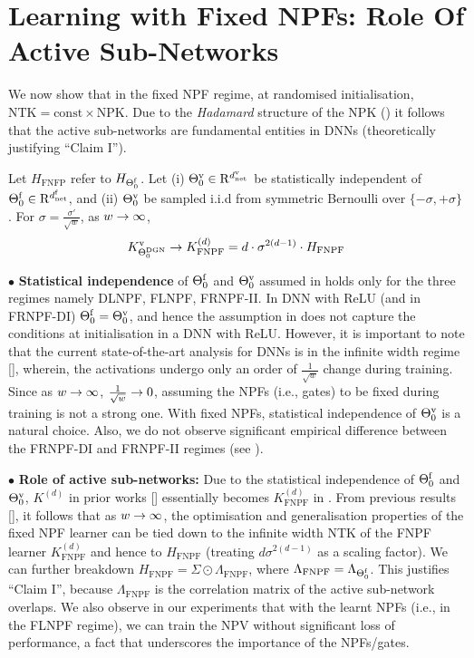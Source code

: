 \documentclass{article}
\begin{document}
\section{Learning with Fixed NPFs: Role Of Active Sub-Networks}\label{sec:infomeasure}
We now show that in the fixed NPF regime, at randomised initialisation, $\text{NTK}=\text{const}\times\text{NPK}$. Due to the \emph{Hadamard} structure of the NPK () it follows that the active sub-networks are fundamental entities in DNNs (theoretically justifying  ``Claim I''). 
\begin{theorem} \label{th:main} Let $H_{\text{FNFP}}$ refer to $H_{\Theta^{\textrm{f}}_0}$. Let (i) ${\Theta}^{\text{v}}_0\in\mathrm{R}^{d^{\text{v}}_{\text{net}}}$ be statistically independent of  $\Theta^{\textrm{f}}_0\in\mathrm{R}^{d^{\text{f}}_{\text{net}}}$, and (ii) ${\Theta}^{\text{v}}_0$ be sampled i.i.d from symmetric Bernoulli over $\{-\sigma,+\sigma\}$. For $\sigma=\frac{\sigma'}{\sqrt{w}}$,  as $w\rightarrow\infty$,  \begin{align*}K^{\text{v}}_{\Theta^{\text{DGN}}_0}\rightarrow K^{(d)}_{\text{FNPF}} =d\cdot \sigma^{2(d-1)} \cdot H_{\text{FNPF}}\end{align*}
\end{theorem}
$\bullet$ \textbf{Statistical independence} of $\Theta^{\textrm{f}}_0$ and ${\Theta}^{\text{v}}_0$ assumed in  holds only for the three regimes namely DLNPF, FLNPF, FRNPF-II. In DNN with ReLU (and in FRNPF-DI) $\Theta^{\textrm{f}}_0={\Theta}^{\text{v}}_0$, and hence the assumption in  does not capture the conditions at initialisation in a DNN with ReLU. However, it is important to note that the current state-of-the-art analysis for DNNs is in the infinite width regime [], wherein, the activations undergo only an order of $\frac{1}{\sqrt{w}}$ change during training. Since as $w\rightarrow\infty$, $\frac{1}{\sqrt{w}}\rightarrow 0$, assuming the NPFs (i.e., gates) to be fixed during training is not a strong one. With fixed NPFs, statistical independence of ${\Theta}^{\text{v}}_0$ is a natural choice. Also, we do not observe significant empirical difference between the FRNPF-DI and FRNPF-II regimes (see ).

$\bullet$ \textbf{Role of active sub-networks:} Due to the statistical independence of $\Theta^{\textrm{f}}_0$ and ${\Theta}^{\text{v}}_0$, $K^{(d)}$ in prior works [] essentially becomes $K^{(d)}_{\text{FNPF}}$ in .  From previous results [], it follows that as $w\rightarrow\infty$, the optimisation and generalisation properties of the fixed NPF learner can be tied down to the infinite width NTK of the FNPF learner $K^{(d)}_{\text{FNPF}}$ and hence to $H_{\text{FNPF}}$ (treating $d\sigma^{2(d-1)}$ as a scaling factor).  We can further breakdown $H_{\text{FNPF}}=\Sigma\odot{\Lambda}_{\text{FNPF}}$, where $\Lambda_{\text{FNPF}}=\Lambda_{\Theta^{\textrm{f}}_0}$. This justifies ``Claim I'',  because $\Lambda_{\text{FNPF}}$ is the correlation matrix of the active sub-network overlaps. We also observe in our experiments that with the learnt NPFs (i.e., in the FLNPF regime), we can train the NPV without significant loss of performance, a fact that underscores the importance of the NPFs/gates.
\end{document}
